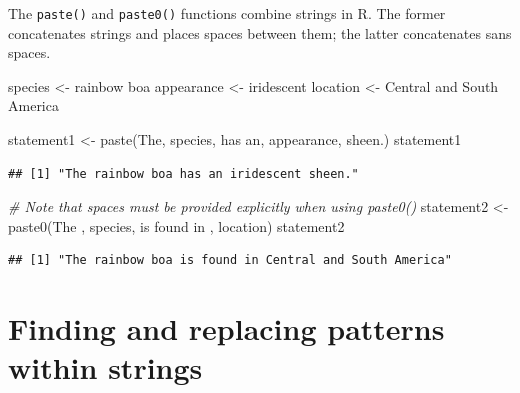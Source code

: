\documentclass[
]{book}
\newenvironment{Shaded}{\begin{snugshade}}{\end{snugshade}}
\newcommand{\CommentTok}[1]{\textcolor[rgb]{0.56,0.35,0.01}{\textit{#1}}}
\newcommand{\FunctionTok}[1]{\textcolor[rgb]{0.00,0.00,0.00}{#1}}
\newcommand{\NormalTok}[1]{#1}
\newcommand{\OtherTok}[1]{\textcolor[rgb]{0.56,0.35,0.01}{#1}}
\newcommand{\StringTok}[1]{\textcolor[rgb]{0.31,0.60,0.02}{#1}}
\begin{document}
The \texttt{paste()} and \texttt{paste0()} functions combine strings in R. The former concatenates strings and places spaces between them; the latter concatenates sans spaces.

\begin{Shaded}
\begin{Highlighting}[]
\NormalTok{species }\OtherTok{\textless{}{-}} \StringTok{\textquotesingle{}rainbow boa\textquotesingle{}}
\NormalTok{appearance }\OtherTok{\textless{}{-}} \StringTok{\textquotesingle{}iridescent\textquotesingle{}}
\NormalTok{location }\OtherTok{\textless{}{-}} \StringTok{\textquotesingle{}Central and South America\textquotesingle{}}

\NormalTok{statement1 }\OtherTok{\textless{}{-}} \FunctionTok{paste}\NormalTok{(}\StringTok{\textquotesingle{}The\textquotesingle{}}\NormalTok{, species, }\StringTok{\textquotesingle{}has an\textquotesingle{}}\NormalTok{, appearance, }\StringTok{\textquotesingle{}sheen.\textquotesingle{}}\NormalTok{)}
\NormalTok{statement1}
\end{Highlighting}
\end{Shaded}

\begin{verbatim}
## [1] "The rainbow boa has an iridescent sheen."
\end{verbatim}

\begin{Shaded}
\begin{Highlighting}[]
\CommentTok{\# Note that spaces must be provided explicitly when using paste0()}
\NormalTok{statement2 }\OtherTok{\textless{}{-}} \FunctionTok{paste0}\NormalTok{(}\StringTok{\textquotesingle{}The \textquotesingle{}}\NormalTok{, species, }\StringTok{\textquotesingle{} is found in \textquotesingle{}}\NormalTok{, location)}
\NormalTok{statement2}
\end{Highlighting}
\end{Shaded}

\begin{verbatim}
## [1] "The rainbow boa is found in Central and South America"
\end{verbatim}

\hypertarget{finding-and-replacing-patterns-within-strings}{%
\section{Finding and replacing patterns within strings}\label{finding-and-replacing-patterns-within-strings}}
\end{document}
